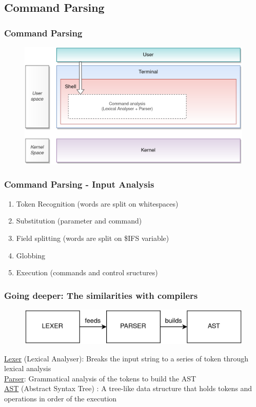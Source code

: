 \documentclass[aspectratio=169,10pt]{beamer}
\begin{document}
\subsection{Command Parsing}

\begin{frame}
  \frametitle{Command Parsing}
    \begin{figure}[h]
        \includegraphics[scale=0.8]{./images/ShellStepsBeforeAnalysis}
    \end{figure}
\end{frame}

\begin{frame}
  \frametitle{Command Parsing - Input Analysis}
    \normalsize{
  \begin{enumerate}
    \item Token Recognition (words are split on whitespaces)
    \item Substitution (parameter and command)
    \item Field splitting (words are split on \$IFS variable)
    \item Globbing
    \item Execution (commands and control sructures)
  \end{enumerate}
  }
\end{frame}

\begin{frame}
  \frametitle{Going deeper: The similarities with compilers}

    \begin{figure}
        \includegraphics[scale=0.85]{./images/LexerParserAST}
    \end{figure}

    \vspace{\baselineskip}

    \underline{Lexer} (Lexical Analyser): Breaks the input string to a series of token through lexical analysis\\
    \underline{Parser}: Grammatical analysis of the tokens to build the AST\\
    \underline{AST} (Abstract Syntax Tree) : A tree-like data structure that holds tokens and operations in order of the execution
\end{frame}
\end{document}
